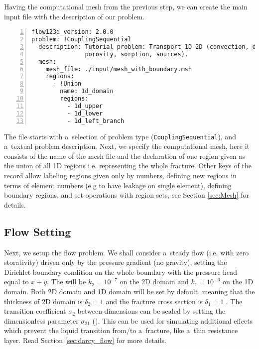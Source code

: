 Having the computational mesh from the previous step, we can create the main input file with the description of our problem. 
\begin{Verbatim}[numbers=left]
flow123d_version: 2.0.0
problem: !CouplingSequential
  description: Tutorial problem: Transport 1D-2D (convection, dual
               porosity, sorption, sources).
  mesh:
    mesh_file: ./input/mesh_with_boundary.msh
    regions:
      - !Union
        name: 1d_domain
        regions:
          - 1d_upper
          - 1d_lower
          - 1d_left_branch
\end{Verbatim}
The file starts with a~selection of problem type (\verb'CouplingSequential'), and a~textual problem description.
Next, we specify the computational mesh, here it consists of the name of the mesh file and the declaration of one region 
given as the union of all 1D regions i.e. representing the whole fracture. Other keys of the  record allow labeling regions given only by numbers, 
defining new regions in terms of element numbers (e.g to have leakage on single element), 
defining boundary regions, and set operations with region sets, see Section \ref{sec:Mesh} for details.

\subsection{Flow Setting}
Next, we setup the flow problem. We shall consider a~steady flow (i.e. with zero storativity) driven only by the pressure gradient (no gravity),
setting the Dirichlet boundary condition on the whole boundary with the pressure head equal to $x+y$. 
The  will be $k_2=10^{-7}$  on the 2D domain and $k_1=10^{-6}$  on the 1D domain.
Both 2D domain and 1D domain  will be set by default,
meaning that the thickness of 2D domain is $\delta_2=1$  and the fracture cross section is $\delta_1=1$ .
The transition coefficient $\sigma_2$ between dimensions can be scaled by setting the dimensionless parameter 
$\sigma_{21}$ (). This can be used for simulating additional
effects which prevent the liquid transition from/to a~fracture, like a~thin resistance layer. Read Section 
\ref{sec:darcy_flow} for more details.

